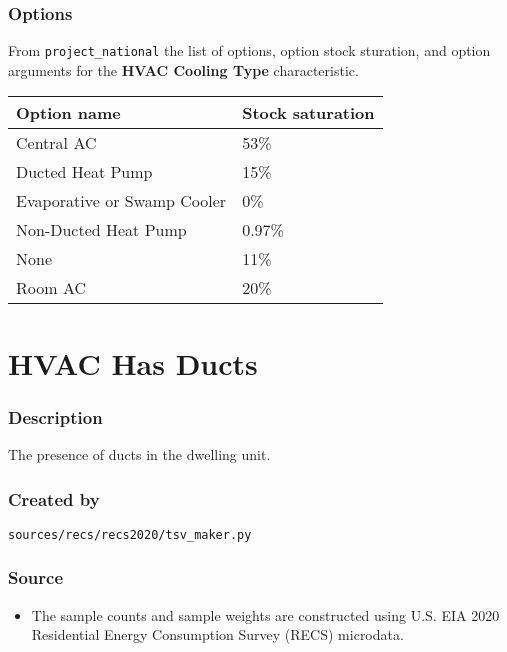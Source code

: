 \subsubsection{Options}\label{options-66}

From \texttt{project\_national} the list of options, option stock
sturation, and option arguments for the \textbf{HVAC Cooling Type}
characteristic.

\begin{longtable}[]{@{}ll@{}}
\toprule\noalign{}
Option name & Stock saturation \\
\midrule\noalign{}
\endhead
\bottomrule\noalign{}
\endlastfoot
Central AC & 53\% \\
Ducted Heat Pump & 15\% \\
Evaporative or Swamp Cooler & 0\% \\
Non-Ducted Heat Pump & 0.97\% \\
None & 11\% \\
Room AC & 20\% \\
\end{longtable}

\section{HVAC Has Ducts}\label{hvac_has_ducts}

\subsubsection{Description}\label{description-67}

The presence of ducts in the dwelling unit.

\subsubsection{Created by}\label{created-by-67}

\texttt{sources/recs/recs2020/tsv\_maker.py}

\subsubsection{Source}\label{source-66}

\begin{itemize}
 
\item
  The sample counts and sample weights are constructed using U.S. EIA
  2020 Residential Energy Consumption Survey (RECS) microdata.
\end{itemize}

